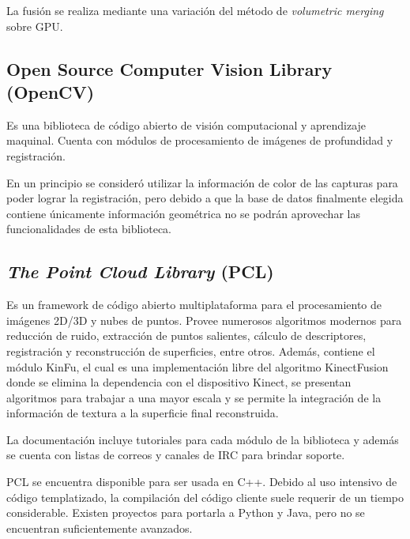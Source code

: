 	La fusión se realiza mediante una variación del método de
	\emph{volumetric merging} sobre GPU\cite{Izadi:2011:KRR:2047196.2047270}.





	\subsection{Open Source Computer Vision Library (OpenCV)}
	Es una biblioteca de código abierto de visión computacional y aprendizaje
	maquinal.  Cuenta con módulos de procesamiento de imágenes de profundidad y
	registración.

	En un principio se consideró utilizar la información de color de las capturas
	para poder lograr la registración, pero debido a que la base de datos
	finalmente elegida contiene únicamente información geométrica
	no se podrán aprovechar las funcionalidades de esta biblioteca.

	\subsection{\emph{The Point Cloud Library} (PCL)}
	Es un framework de código abierto multiplataforma para el procesamiento de
	imágenes 2D/3D y nubes de puntos.
	Provee numerosos algoritmos modernos para reducción de ruido, extracción de
	puntos salientes, cálculo de descriptores, registración y reconstrucción de
	superficies, entre otros\cite{5980567}.
	Además, contiene el módulo KinFu, el cual es una implementación libre del algoritmo KinectFusion
	donde se elimina la dependencia con el dispositivo Kinect,
	se presentan algoritmos para trabajar a una mayor escala
	y se permite la integración de la información de textura a la superficie final reconstruida\cite{real-time-3d-reconstruction-using-a-kinect-sensor}.

	La documentación incluye tutoriales para cada módulo de la biblioteca y
	además se cuenta con listas de correos y canales de IRC para brindar
	soporte.

	PCL se encuentra disponible para ser usada en C++.
	Debido al uso intensivo de código templatizado, la compilación del
	código cliente suele requerir de un tiempo considerable.
	Existen proyectos para portarla a Python y Java, pero no se encuentran
	suficientemente avanzados.

